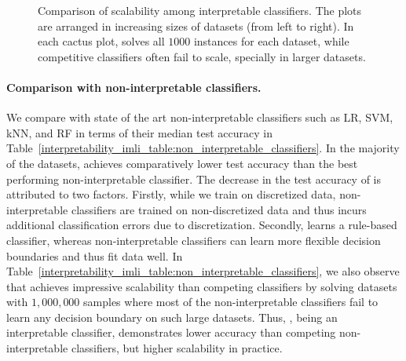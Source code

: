 \begin{figure}[!t]
	
	\caption[Scalability of Interpretable Classifiers]{Comparison of scalability among interpretable classifiers. The plots are arranged in increasing sizes of datasets (from left to right). In each cactus plot, {\imli} solves all $ 1000 $ instances for each dataset, while competitive classifiers often fail to scale, specially in larger datasets.}
	\label{interpretability_imli_fig:interpretable_classifiers}
\end{figure}






\paragraph{Comparison with non-interpretable classifiers.} We compare {\imli} with state of the art non-interpretable classifiers such as LR, SVM, kNN, and RF in terms of their median test accuracy in Table~\ref{interpretability_imli_table:non_interpretable_classifiers}. In the majority of the datasets, {\imli} achieves comparatively lower test accuracy than the best performing non-interpretable classifier. The decrease in the test accuracy of {\imli} is attributed to two factors. Firstly, while we train {\imli} on discretized data, non-interpretable classifiers are trained on non-discretized data and thus {\imli} incurs additional classification errors due to discretization. Secondly, {\imli} learns a rule-based classifier, whereas non-interpretable classifiers can learn more flexible decision boundaries and thus fit data well. In Table~\ref{interpretability_imli_table:non_interpretable_classifiers}, we also observe that {\imli} achieves impressive scalability than competing classifiers by solving datasets with $ 1, 000,000 $  samples where most of the non-interpretable classifiers fail to learn any decision boundary on such large datasets. Thus, {\imli}, being an interpretable classifier, demonstrates lower accuracy than competing non-interpretable classifiers, but higher scalability in practice. 


